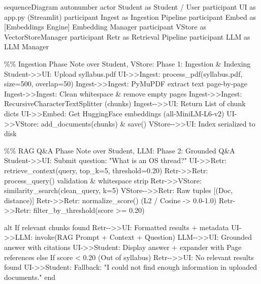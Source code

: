 \documentclass[
]{article}
\newenvironment{Shaded}{}{}
\newcommand{\NormalTok}[1]{#1}
\begin{document}
\begin{Shaded}
\begin{Highlighting}[]
\NormalTok{sequenceDiagram}
\NormalTok{    autonumber}
\NormalTok{    actor Student as  Student / User}
\NormalTok{    participant UI as  app.py (Streamlit)}
\NormalTok{    participant Ingest as  Ingestion Pipeline}
\NormalTok{    participant Embed as [Embeddings Engine]  Embedding Manager}
\NormalTok{    participant VStore as  VectorStoreManager}
\NormalTok{    participant Retr as  Retrieval Pipeline}
\NormalTok{    participant LLM as  LLM Manager}

\NormalTok{    \%\% Ingestion Phase}
\NormalTok{    Note over Student, VStore: Phase 1: Ingestion \& Indexing}
\NormalTok{    Student{-}\textgreater{}\textgreater{}UI: Upload syllabus.pdf}
\NormalTok{    UI{-}\textgreater{}\textgreater{}Ingest: process\_pdf(syllabus.pdf, size=500, overlap=50)}
\NormalTok{    Ingest{-}\textgreater{}\textgreater{}Ingest: PyMuPDF extract text page{-}by{-}page}
\NormalTok{    Ingest{-}\textgreater{}\textgreater{}Ingest: Clean whitespace \& remove empty pages}
\NormalTok{    Ingest{-}\textgreater{}\textgreater{}Ingest: RecursiveCharacterTextSplitter (chunks)}
\NormalTok{    Ingest{-}{-}\textgreater{}\textgreater{}UI: Return List of chunk dicts}
\NormalTok{    UI{-}\textgreater{}\textgreater{}Embed: Get HuggingFace embeddings (all{-}MiniLM{-}L6{-}v2)}
\NormalTok{    UI{-}\textgreater{}\textgreater{}VStore: add\_documents(chunks) \& save()}
\NormalTok{    VStore{-}{-}\textgreater{}\textgreater{}UI: Index serialized to disk}

\NormalTok{    \%\% RAG Q\&A Phase}
\NormalTok{    Note over Student, LLM: Phase 2: Grounded Q\&A}
\NormalTok{    Student{-}\textgreater{}\textgreater{}UI: Submit question: "What is an OS thread?"}
\NormalTok{    UI{-}\textgreater{}\textgreater{}Retr: retrieve\_context(query, top\_k=5, threshold=0.20)}
\NormalTok{    Retr{-}\textgreater{}\textgreater{}Retr: process\_query() validation \& whitespace strip}
\NormalTok{    Retr{-}\textgreater{}\textgreater{}VStore: similarity\_search(clean\_query, k=5)}
\NormalTok{    VStore{-}{-}\textgreater{}\textgreater{}Retr: Raw tuples [(Doc, distance)]}
\NormalTok{    Retr{-}\textgreater{}\textgreater{}Retr: normalize\_score() (L2 / Cosine {-}\textgreater{} 0.0{-}1.0)}
\NormalTok{    Retr{-}\textgreater{}\textgreater{}Retr: filter\_by\_threshold(score \textgreater{}= 0.20)}
    
\NormalTok{    alt If relevant chunks found}
\NormalTok{        Retr{-}{-}\textgreater{}\textgreater{}UI: Formatted results + metadata}
\NormalTok{        UI{-}\textgreater{}\textgreater{}LLM: invoke(RAG Prompt + Context + Question)}
\NormalTok{        LLM{-}{-}\textgreater{}\textgreater{}UI: Grounded answer with citations}
\NormalTok{        UI{-}\textgreater{}\textgreater{}Student: Display answer + expander with Page references}
\NormalTok{    else If score \textless{} 0.20 (Out of syllabus)}
\NormalTok{        Retr{-}{-}\textgreater{}\textgreater{}UI: No relevant results found}
\NormalTok{        UI{-}\textgreater{}\textgreater{}Student: Fallback: "I could not find enough information in uploaded documents."}
\NormalTok{    end}
\end{Highlighting}
\end{Shaded}
\end{document}
